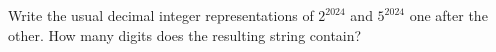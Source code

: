 Write the usual decimal integer representations of $2^{2024}$ and $5^{2024}$ one after the other. How many digits does the resulting string contain?
